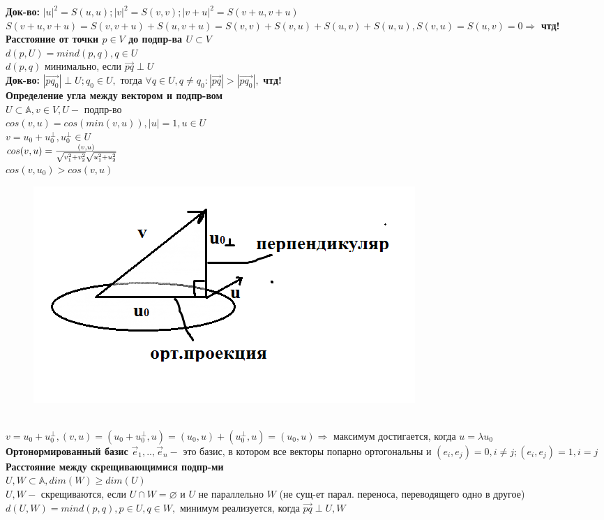 \documentclass[12pt, oneside]{book}
\theoremstyle{definition}
\renewcommand{\geq}{\geqslant}
\begin{document}
\begin{enumerate}
\textbf{Док-во:} $|u|^2=S(u,u); |v|^2=S(v,v); |v+u|^2=S(v+u,v+u)$\\
$S(v+u,v+u)=S(v,v+u)+S(u,v+u)=S(v,v)+S(v,u)+S(u,v)+S(u,u), S(v,u)=S(u,v)=0 \Longrightarrow$ \textbf{чтд!}\\
\textbf{Расстояние от точки $p \in V$ до подпр-ва $U \subset V$}\\
$d(p,U)=min d(p,q), q \in U$\\
$d(p,q)$ минимально, если $\overrightarrow{pq} \perp U$\\
\textbf{Док-во:} $|\overrightarrow{pq_0}| \perp U; q_0 \in U,$ тогда $\forall q \in U, q \neq q_0: |\overrightarrow{pq}|>|\overrightarrow{pq_0}|,$ \textbf{чтд!}\\
\textbf{Определение угла между вектором и подпр-вом}\\
$U \subset \mathbb{A}, v \in V, U -$ подпр-во\\
$cos(v,u)=cos(min(v,u)), |u|=1, u \in U$\\
$v=u_0+u^{\perp}_0, u^{\perp}_0 \in U$\\
$cos(v,u)={(v,u) \over{\sqrt{v^2_1+v^2_2} \sqrt{u^2_1+u^2_2}}}$\\
$cos(v,u_0)>cos(v,u)$ \\
\begin{figure}[h!]
\centering
\includegraphics[scale=0.6]{11-1.PNG}
\end{figure}\\
$v=u_0+u^{\perp}_0, (v,u)=(u_0+u^{\perp}_0, u)=(u_0,u)+(u^{\perp}_0,u)=(u_0,u) \Longrightarrow$ максимум достигается, когда $u=\lambda u_0$\\
\textbf{Ортонормированный базис} $\overrightarrow e_1,..,\overrightarrow e_n - $ это базис, в котором все векторы попарно ортогональны и $(e_i,e_j)=0, i \neq j; (e_i,e_j)=1, i=j$\\
\textbf{Расстояние между скрещивающимися подпр-ми}\\
$U,W \subset \mathbb{A}, dim(W)\geq dim(U)$\\
$U,W -$ скрещиваются, если $U \cap W=\varnothing$ и $U$ не параллельно $W$ (не сущ-ет парал. переноса, переводящего одно в другое)\\
$d(U,W)=mind(p,q), p \in U, q \in W,$ минимум реализуется, когда $\overrightarrow{pq} \perp U,W$\\


\end{enumerate}
\end{document}
